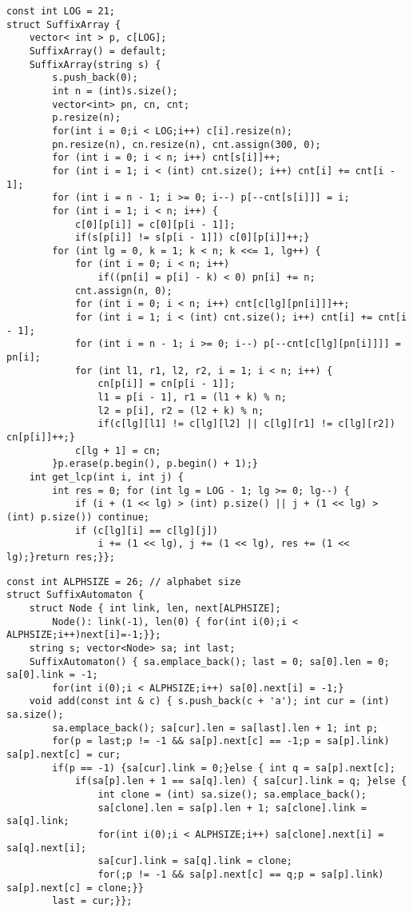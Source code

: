 \documentclass[12pt]{article}
\begin{document}
\begin{verbatim}
const int LOG = 21;
struct SuffixArray {
    vector< int > p, c[LOG];
    SuffixArray() = default;
    SuffixArray(string s) {
        s.push_back(0);
        int n = (int)s.size();
        vector<int> pn, cn, cnt;
        p.resize(n);
        for(int i = 0;i < LOG;i++) c[i].resize(n);
        pn.resize(n), cn.resize(n), cnt.assign(300, 0);
        for (int i = 0; i < n; i++) cnt[s[i]]++;
        for (int i = 1; i < (int) cnt.size(); i++) cnt[i] += cnt[i - 1];
        for (int i = n - 1; i >= 0; i--) p[--cnt[s[i]]] = i;
        for (int i = 1; i < n; i++) {
            c[0][p[i]] = c[0][p[i - 1]];
            if(s[p[i]] != s[p[i - 1]]) c[0][p[i]]++;}
        for (int lg = 0, k = 1; k < n; k <<= 1, lg++) {
            for (int i = 0; i < n; i++)
                if((pn[i] = p[i] - k) < 0) pn[i] += n;
            cnt.assign(n, 0);
            for (int i = 0; i < n; i++) cnt[c[lg][pn[i]]]++;
            for (int i = 1; i < (int) cnt.size(); i++) cnt[i] += cnt[i - 1];
            for (int i = n - 1; i >= 0; i--) p[--cnt[c[lg][pn[i]]]] = pn[i];
            for (int l1, r1, l2, r2, i = 1; i < n; i++) {
                cn[p[i]] = cn[p[i - 1]];
                l1 = p[i - 1], r1 = (l1 + k) % n;
                l2 = p[i], r2 = (l2 + k) % n;
                if(c[lg][l1] != c[lg][l2] || c[lg][r1] != c[lg][r2]) cn[p[i]]++;}
            c[lg + 1] = cn;
        }p.erase(p.begin(), p.begin() + 1);}
    int get_lcp(int i, int j) {
        int res = 0; for (int lg = LOG - 1; lg >= 0; lg--) {
            if (i + (1 << lg) > (int) p.size() || j + (1 << lg) > (int) p.size()) continue;
            if (c[lg][i] == c[lg][j])
                i += (1 << lg), j += (1 << lg), res += (1 << lg);}return res;}};
\end{verbatim}

\begin{verbatim}
const int ALPHSIZE = 26; // alphabet size
struct SuffixAutomaton {
    struct Node { int link, len, next[ALPHSIZE];
        Node(): link(-1), len(0) { for(int i(0);i < ALPHSIZE;i++)next[i]=-1;}};
    string s; vector<Node> sa; int last;
    SuffixAutomaton() { sa.emplace_back(); last = 0; sa[0].len = 0; sa[0].link = -1;
        for(int i(0);i < ALPHSIZE;i++) sa[0].next[i] = -1;}
    void add(const int & c) { s.push_back(c + 'a'); int cur = (int) sa.size();
        sa.emplace_back(); sa[cur].len = sa[last].len + 1; int p;
        for(p = last;p != -1 && sa[p].next[c] == -1;p = sa[p].link) sa[p].next[c] = cur;
        if(p == -1) {sa[cur].link = 0;}else { int q = sa[p].next[c];
            if(sa[p].len + 1 == sa[q].len) { sa[cur].link = q; }else {
                int clone = (int) sa.size(); sa.emplace_back();
                sa[clone].len = sa[p].len + 1; sa[clone].link = sa[q].link;
                for(int i(0);i < ALPHSIZE;i++) sa[clone].next[i] = sa[q].next[i];
                sa[cur].link = sa[q].link = clone;
                for(;p != -1 && sa[p].next[c] == q;p = sa[p].link) sa[p].next[c] = clone;}}
        last = cur;}};
\end{verbatim}
\end{document}
